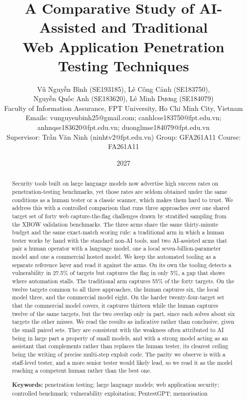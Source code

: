 \documentclass[11pt]{article}
\title{\textbf{A Comparative Study of AI-Assisted and Traditional\\
Web Application Penetration Testing Techniques}}
\author{%
Vũ Nguyễn Bình (SE193185), Lê Công Cảnh (SE183750),\\
Nguyễn Quốc Anh (SE183620), Lê Minh Dương (SE184079)\\[4pt]
\small Faculty of Information Assurance, FPT University, Ho Chi Minh City, Vietnam\\
\small Emails: vunguyenbinh25@gmail.com; canhlcse183750@fpt.edu.vn; anhnqse183620@fpt.edu.vn; duonglmse184079@fpt.edu.vn\\[4pt]
\small Supervisor: Trần Văn Ninh (ninhtv2@fpt.edu.vn) \quad\textbar\quad Group: GFA261A11 \quad\textbar\quad Course: FA261A11
}
\date{2027}
\begin{document}
\maketitle

\begin{abstract}
\noindent
Security tools built on large language models now advertise high success rates on penetration-testing benchmarks, yet those rates are seldom obtained under the same conditions as a human tester or a classic scanner, which makes them hard to trust. We address this with a controlled comparison that runs three approaches over one shared target set of forty web capture-the-flag challenges drawn by stratified sampling from the XBOW validation benchmarks. The three arms share the same thirty-minute budget and the same exact-match scoring rule: a traditional arm in which a human tester works by hand with the standard non-AI tools, and two AI-assisted arms that pair a human operator with a language model, one a local seven-billion-parameter model and one a commercial hosted model. We keep the automated tooling as a separate reference layer and read it against the arms. On its own the tooling detects a vulnerability in 27.5\% of targets but captures the flag in only 5\%, a gap that shows where automation stalls. The traditional arm captures 55\% of the forty targets. On the twelve targets common to all three approaches, the human captures six, the local model three, and the commercial model eight. On the harder twenty-four-target set that the commercial model covers, it captures thirteen while the human captures twelve of the same targets, but the two overlap only in part, since each solves about six targets the other misses. We read the results as indicative rather than conclusive, given the small paired sets. They are consistent with the weakness often attributed to AI being in large part a property of small models, and with a strong model acting as an assistant that complements rather than replaces the human tester, its clearest ceiling being the writing of precise multi-step exploit code. The parity we observe is with a staff-level tester, and a more senior tester would likely lead, so we read it as the model reaching a competent human rather than the best one.

\vspace{6pt}
\noindent\textbf{Keywords:} penetration testing; large language models; web application security; controlled benchmark; vulnerability exploitation; PentestGPT; memorisation
\end{abstract}
\end{document}
